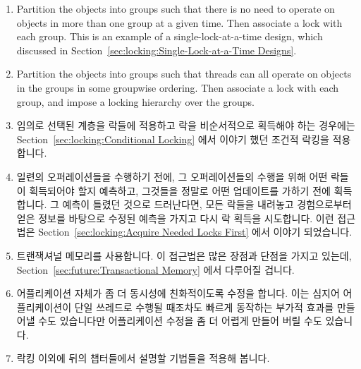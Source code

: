 {\begin{enumerate}
	\item	Partition the objects into groups such that there
		is no need to operate on objects in
		more than one group at a given time.
		Then associate a lock with each group.
		This is an example of a single-lock-at-a-time
		design, which discussed in
		Section~\ref{sec:locking:Single-Lock-at-a-Time Designs}.
	\item	Partition the objects into groups such that threads
		can all operate on objects in the groups in some
		groupwise ordering.
		Then associate a lock with each group, and impose a
		locking hierarchy over the groups.
	\fi
	\item	임의로 선택된 계층을 락들에 적용하고 락을 비순서적으로 획득해야
		하는 경우에는 
		Section~\ref{sec:locking:Conditional Locking} 에서 이야기 했던
		조건적 락킹을 적용합니다.
	\item	일련의 오퍼레이션들을 수행하기 전에, 그 오퍼레이션들의 수행을
		위해 어떤 락들이 획득되어야 할지 예측하고, 그것들을 정말로 어떤
		업데이트를 가하기 전에 획득합니다.
		그 예측이 틀렸던 것으로 드러난다면, 모든 락들을 내려놓고
		경험으로부터 얻은 정보를 바탕으로 수정된 예측을 가지고 다시 락
		획득을 시도합니다.
		이런 접근법은
		Section~\ref{sec:locking:Acquire Needed Locks First} 에서
		이야기 되었습니다.

	\item	트랜잭셔널 메모리를 사용합니다.
		이 접근법은 많은 장점과 단점을 가지고 있는데,
		Section~\ref{sec:future:Transactional Memory} 에서 다루어질
		겁니다.
	\item	어플리케이션 자체가 좀 더 동시성에 친화적이도록 수정을 합니다.
		이는 심지어 어플리케이션이 단일 쓰레드로 수행될 때조차도 빠르게
		동작하는 부가적 효과를 만들어낼 수도 있습니다만 어플리케이션
		수정을 좀 더 어렵게 만들어 버릴 수도 있습니다.
	\item	락킹 이외에 뒤의 챕터들에서 설명할 기법들을 적용해 봅니다.
	\iffalse


\end{enumerate}}
